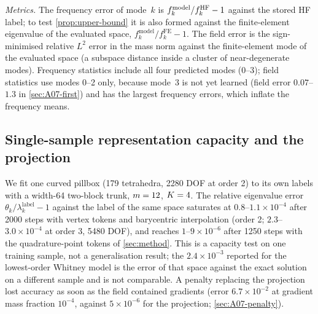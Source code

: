 \emph{Metrics.} The frequency error of mode~$k$ is $f_k^{\mathrm{model}}/f_k^{\mathrm{HF}}-1$ against the stored HF label; to test \cref{prop:upper-bound} it is also formed against the finite-element eigenvalue of the evaluated space, $f_k^{\mathrm{model}}/f_k^{\mathrm{FE}}-1$.
The field error is the sign-minimised relative $L^2$ error in the mass norm against the finite-element mode of the evaluated space (a subspace distance inside a cluster of near-degenerate modes).
Frequency statistics include all four predicted modes (0--3); field statistics use modes 0--2 only, because mode~3 is not yet learned (field error $0.07$--$1.3$ in \cref{sec:A07-first}) and has the largest frequency errors, which inflate the frequency means.

\subsection{Single-sample representation capacity and the projection}\label{sec:07-floor}\label{sec:07-penalty}
We fit one curved pillbox (179 tetrahedra, 2280 DOF at order 2) to its own labels with a width-64 two-block trunk, $m=12$, $K=4$. The relative eigenvalue error $\theta_k/\lambda_k^{\mathrm{label}}-1$ against the label of the same space saturates at $0.8$--$1.1\times10^{-4}$ after 2000 steps with vertex tokens and barycentric interpolation (order 2; $2.3$--$3.0\times10^{-4}$ at order 3, 5480 DOF), and reaches $1$--$9\times10^{-6}$ after 1250 steps with the quadrature-point tokens of \cref{sec:method}.
This is a capacity test on one training sample, not a generalisation result; the $2.4\times10^{-3}$ reported for the lowest-order Whitney model is the error of that space against the exact solution on a different sample and is not comparable. A penalty replacing the projection lost accuracy as soon as the field contained gradients (error $6.7\times10^{-2}$ at gradient mass fraction $10^{-4}$, against $5\times10^{-6}$ for the projection; \cref{sec:A07-penalty}).

